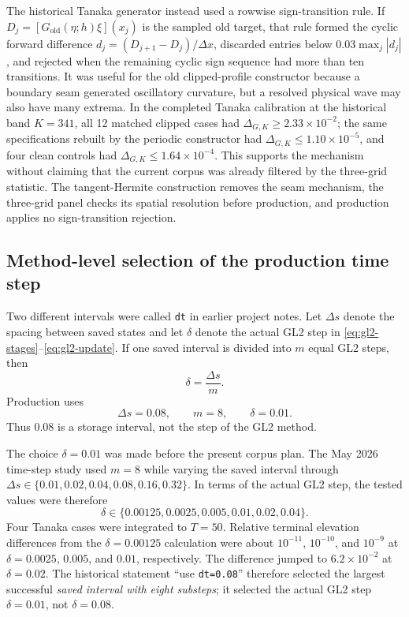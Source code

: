 \documentclass[11pt]{article}
\begin{document}
The historical Tanaka generator instead used a rowwise sign-transition rule.
If
$D_j=[G_{\mathrm{old}}(\eta;h)\xi](x_j)$ is the sampled old target, that rule
formed the cyclic forward difference
$d_j=(D_{j+1}-D_j)/\Delta x$, discarded entries below
$0.03\max_j|d_j|$, and rejected when the remaining cyclic sign sequence had
more than ten transitions.  It was useful for the old clipped-profile
constructor because a boundary seam generated oscillatory curvature, but a
resolved physical wave may also have many extrema.  In the completed Tanaka
calibration at the historical band $K=341$, all 12 matched clipped cases had
$\Delta_{G,K}\geq2.33\times10^{-2}$; the same specifications rebuilt by the
periodic constructor had $\Delta_{G,K}\leq1.10\times10^{-5}$, and four clean
controls had $\Delta_{G,K}\leq1.64\times10^{-4}$.  This supports the mechanism
without claiming that the current corpus was already filtered by the
three-grid statistic.  The tangent-Hermite construction removes the seam
mechanism, the three-grid panel checks its spatial resolution before
production, and production applies no sign-transition rejection.

\subsection{Method-level selection of the production time step}

Two different intervals were called \texttt{dt} in earlier project notes.
Let $\Delta s$ denote the spacing between saved states and let $\delta$ denote
the actual GL2 step in \eqref{eq:gl2-stages}--\eqref{eq:gl2-update}.  If one
saved interval is divided into $m$ equal GL2 steps, then
\begin{equation}
  \delta=\frac{\Delta s}{m}.
  \label{eq:inner-gl2-step}
\end{equation}
Production uses
\begin{equation}
  \Delta s=0.08,\qquad m=8,\qquad \delta=0.01.
  \label{eq:production-gl2-step}
\end{equation}
Thus $0.08$ is a storage interval, not the step of the GL2 method.

The choice $\delta=0.01$ was made before the present corpus plan.  The May
2026 time-step study used $m=8$ while varying the saved interval through
$\Delta s\in\{0.01,0.02,0.04,0.08,0.16,0.32\}$.  In terms of the actual GL2
step, the tested values were therefore
\[
  \delta\in\{0.00125,0.0025,0.005,0.01,0.02,0.04\}.
\]
Four Tanaka cases were integrated to $T=50$.  Relative terminal elevation
differences from the $\delta=0.00125$ calculation were about $10^{-11}$,
$10^{-10}$, and $10^{-9}$ at $\delta=0.0025$, $0.005$, and $0.01$,
respectively.  The difference jumped to $6.2\times10^{-2}$ at
$\delta=0.02$.  The historical statement ``use \texttt{dt=0.08}'' therefore
selected the largest successful \emph{saved interval with eight substeps};
it selected the actual GL2 step $\delta=0.01$, not $\delta=0.08$.
\end{document}
